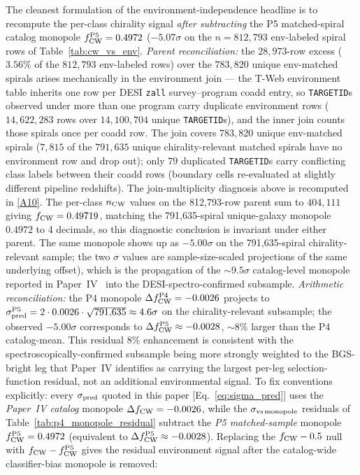 \documentclass[aps,prd,twocolumn,superscriptaddress,showpacs,preprintnumbers,nofootinbib,longbibliography,floatfix]{revtex4-2}
\newcommand{\repoBase}{https://github.com/Hubify-Projects/bigbounce/blob/main}
\begin{document}
The cleanest
formulation of the environment-independence headline is to recompute
the per-class chirality signal \emph{after subtracting} the P5
matched-spiral catalog monopole $f_{\rm CW}^{\rm P5} = 0.4972$
($-5.07\sigma$ on the $n = 812{,}793$ env-labeled spiral rows of
Table~\ref{tab:cw_vs_env}. \emph{Parent reconciliation:} the
$28{,}973$-row excess ($3.56\%$ of the $812{,}793$ env-labeled rows) over the $783{,}820$ unique
env-matched spirals arises mechanically in the
environment join — the T-Web environment table inherits one row per
DESI \texttt{zall} survey--program coadd entry, so \texttt{TARGETID}s
observed under more than one program carry duplicate environment rows
($14{,}622{,}283$ rows over $14{,}100{,}704$ unique
\texttt{TARGETID}s), and the inner join counts those spirals once per
coadd row. The join covers $783{,}820$ unique env-matched spirals
($7{,}815$ of the $791{,}635$ unique chirality-relevant matched spirals have no environment row and drop out); only $79$
duplicated \texttt{TARGETID}s carry conflicting class labels between
their coadd rows (boundary cells re-evaluated at slightly different
pipeline redshifts). The join-multiplicity diagnosis above is recomputed in
\href{\repoBase/pipelines/p5\_desi\_chirality/outputs/17\_v0151\_closure\_recomputes.json}{[A10]}. The per-class
$n_{\rm CW}$ values on the 812{,}793-row parent sum to
$404{,}111$ giving $f_{\rm CW} = 0.49719$, matching the 791{,}635-spiral
unique-galaxy monopole $0.4972$ to 4 decimals, so this diagnostic
conclusion is
invariant under either parent. The same monopole shows up as
$-5.00\sigma$ on the
791{,}635-spiral chirality-relevant sample; the two $\sigma$ values
are sample-size-scaled projections of the same underlying offset),
which is the propagation of the
$\sim\!9.5\sigma$ catalog-level monopole reported in
Paper~IV~\cite{golden_chirality_2026} into the DESI-spectro-confirmed
subsample. \emph{Arithmetic reconciliation:} the P4 monopole
$\Delta f_{\rm CW}^{\rm P4} = -0.0026$ projects to
$\sigma_{\rm pred}^{\rm P5} = 2 \cdot 0.0026 \cdot \sqrt{791{,}635}
\approx 4.6\sigma$ on the chirality-relevant subsample; the observed
$-5.00\sigma$ corresponds to $\Delta f_{\rm CW}^{\rm P5} \approx
-0.0028$, ${\sim}8\%$ larger than the P4 catalog-mean. This residual
$8\%$ enhancement is consistent with the spectroscopically-confirmed
subsample being more strongly weighted to the BGS-bright leg that
Paper~IV identifies as carrying the largest per-leg
selection-function residual, not an additional environmental signal.
To fix conventions explicitly: every $\sigma_{\rm pred}$ quoted in
this paper [Eq.~\eqref{eq:sigma_pred}] uses the \emph{Paper~IV
catalog} monopole $\Delta f_{\rm CW} = -0.0026$, while the
$\sigma_{\rm vs\,monopole}$ residuals of
Table~\ref{tab:p4_monopole_residual} subtract the \emph{P5
matched-sample} monopole $f_{\rm CW}^{\rm P5} = 0.4972$ (equivalent
to $\Delta f_{\rm CW}^{\rm P5} \approx -0.0028$). Replacing the $f_{\rm CW} - 0.5$ null with
$f_{\rm CW} - f_{\rm CW}^{\rm P5}$ gives the residual environment
signal after the catalog-wide classifier-bias monopole is removed:
\end{document}
